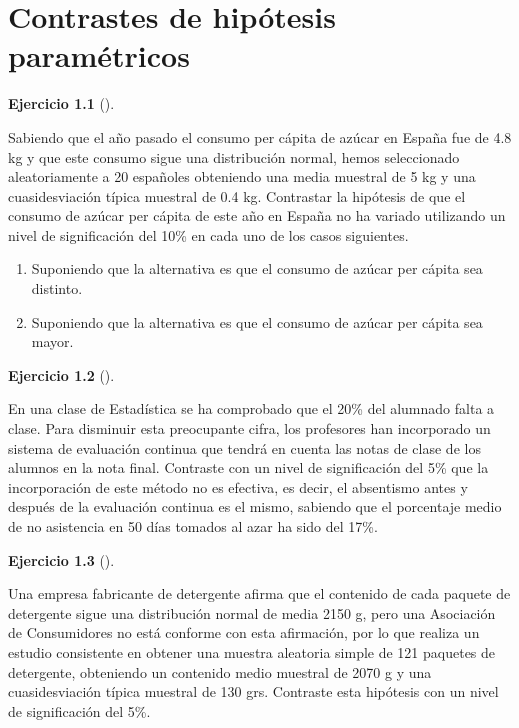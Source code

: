 \documentclass[
  a4paper,
]{scrreport}
\theoremstyle{definition}
\newtheorem{exercise}{Ejercicio}[chapter]
\theoremstyle{remark}
\begin{document}

\chapter{Contrastes de hipótesis
paramétricos}\label{contrastes-de-hipuxf3tesis-paramuxe9tricos}

\begin{exercise}[]\protect\hypertarget{exr-contraste-media-consumo-azucar}{}\label{exr-contraste-media-consumo-azucar}

Sabiendo que el año pasado el consumo per cápita de azúcar en España fue
de 4.8 kg y que este consumo sigue una distribución normal, hemos
seleccionado aleatoriamente a 20 españoles obteniendo una media muestral
de 5 kg y una cuasidesviación típica muestral de 0.4 kg. Contrastar la
hipótesis de que el consumo de azúcar per cápita de este año en España
no ha variado utilizando un nivel de significación del 10\% en cada uno
de los casos siguientes.

\begin{enumerate}
\def\labelenumi{\alph{enumi}.}
\item
  Suponiendo que la alternativa es que el consumo de azúcar per cápita
  sea distinto.
\item
  Suponiendo que la alternativa es que el consumo de azúcar per cápita
  sea mayor.
\end{enumerate}

\end{exercise}

\begin{exercise}[]\protect\hypertarget{exr-contraste-proporcion-asistencia-clase}{}\label{exr-contraste-proporcion-asistencia-clase}

En una clase de Estadística se ha comprobado que el 20\% del alumnado
falta a clase. Para disminuir esta preocupante cifra, los profesores han
incorporado un sistema de evaluación continua que tendrá en cuenta las
notas de clase de los alumnos en la nota final. Contraste con un nivel
de significación del 5\% que la incorporación de este método no es
efectiva, es decir, el absentismo antes y después de la evaluación
continua es el mismo, sabiendo que el porcentaje medio de no asistencia
en 50 días tomados al azar ha sido del 17\%.

\end{exercise}

\begin{exercise}[]\protect\hypertarget{exr-contraste-media-detergente}{}\label{exr-contraste-media-detergente}

Una empresa fabricante de detergente afirma que el contenido de cada
paquete de detergente sigue una distribución normal de media 2150 g,
pero una Asociación de Consumidores no está conforme con esta
afirmación, por lo que realiza un estudio consistente en obtener una
muestra aleatoria simple de 121 paquetes de detergente, obteniendo un
contenido medio muestral de 2070 g y una cuasidesviación típica muestral
de 130 grs. Contraste esta hipótesis con un nivel de significación del
5\%.

\end{exercise}
\end{document}
